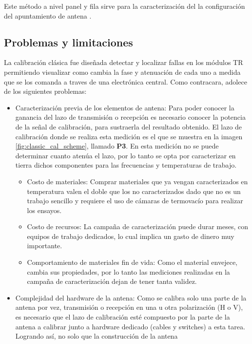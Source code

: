 Este método a nivel panel y fila sirve para la caracterización del la configuración del apuntamiento de antena \cite{Br2007}.

\subsection{Problemas y limitaciones}

La calibración clásica fue diseñada detectar y localizar fallas en los módulos TR permitiendo visualizar como cambia la
fase y atenuación de cada uno a medida que se los comanda a traves de una electrónica central. Como contracara, adolece de
los siguientes problemas:

\begin{itemize}
	\item Caracterización previa de los elementos de antena: Para poder conocer la ganancia del lazo de transmisión o recepción
es necesario conocer la potencia de la señal de calibración, para sustraerla del resultado obtenido. El lazo de calibración
donde se realiza esta medición es el que se muestra en la imagen \ref{fig:classic_cal_scheme}, llamado \textbf{P3}. En esta
medición no se puede determinar cuanto atenúa el lazo, por lo tanto se opta por caracterizar en tierra dichos componentes
para las frecuencias y temperaturas de trabajo.
	\begin{itemize}
		\item Costo de materiales: Comprar materiales que ya vengan caracterizados en temperatura valen el doble que los no
			caracterizados dado que no es un trabajo sencillo y requiere el uso de cámaras de termovacío para realizar los ensayos.
		\item Costo de recursos: La campaña de caracterización puede durar meses, con equipos de trabajo dedicados, lo cual implica
			un gasto de dinero muy importante.
		\item Comportamiento de materiales fin de vida: Como el material envejece, cambia sus propiedades, por lo tanto las mediciones realizadas
			en la campaña de caracterización dejan de tener tanta validez.
	\end{itemize}
	\item Complejidad del hardware de la antena: Como se calibra solo una parte de la antena por vez, transmisión o recepción en
		una u otra polarización (H o V), es necesario que el lazo de calibración esté compuesto por la parte de la antena a
		calibrar junto a hardware dedicado (cables y switches) a esta tarea. Logrando así, no solo que la construcción de la antena

\end{itemize}
